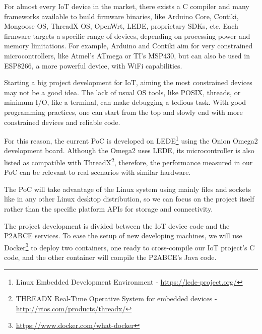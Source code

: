 For almost every IoT device in the market, there exists a C compiler and many frameworks available to build firmware binaries, like Arduino Core, Contiki, Mongoose OS, ThreadX OS, OpenWrt, LEDE, proprietary SDKs, etc. Each firmware targets a specific range of devices, depending on processing power and memory limitations. For example, Arduino and Contiki aim for very constrained microcontrollers, like Atmel's ATmega or TI's MSP430, but can also be used in ESP8266, a more powerful device, with WiFi capabilities.

Starting a big project development for \ac{IoT}, aiming the most constrained devices may not be a good idea. The lack of usual OS tools, like POSIX, threads, or minimum I/O, like a terminal, can make debugging a tedious task. With good programming practices, one can start from the top and slowly end with more constrained devices and reliable code.


For this reason, the current \ac{PoC} is developed on LEDE\footnote{Linux Embedded Development Environment - \url{https://lede-project.org/}} using the Onion Omega2 development board. Although the Omega2 uses LEDE, its microcontroller is also listed as compatible with ThreadX\footnote{THREADX Real-Time Operative System for embedded devices - \url{http://rtos.com/products/threadx/}}, therefore, the performance measured in our PoC can be relevant to real scenarios with similar hardware.

The PoC will take advantage of the Linux system using mainly files and sockets like in any other Linux desktop distribution, so we can focus on the project itself rather than the specific platform APIs for storage and connectivity.


\hfil

The project development is divided between the IoT device code and the P2ABCE services. To ease the setup of new developing machines, we will use Docker\footnote{\url{https://www.docker.com/what-docker}} to deploy two containers, one ready to cross-compile our IoT project's C code, and the other container will compile the P2ABCE's Java code.

